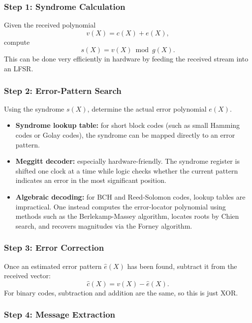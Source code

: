 \documentclass[11pt,oneside]{book}
\providecommand{\tightlist}{\setlength{\itemsep}{0pt}\setlength{\parskip}{0pt}}
\theoremstyle{plain}
\theoremstyle{definition}
\theoremstyle{remark}
\begin{document}
\subsubsection{Step 1: Syndrome
Calculation}\label{step-1-syndrome-calculation}

Given the received polynomial \[v(X)=c(X)+e(X),\] compute
\[s(X)=v(X) \bmod g(X).\] This can be done very efficiently in hardware
by feeding the received stream into an LFSR.

\subsubsection{Step 2: Error-Pattern
Search}\label{step-2-error-pattern-search}

Using the syndrome \(s(X)\), determine the actual error polynomial
\(e(X)\).

\begin{itemize}
\tightlist
\item
  \textbf{Syndrome lookup table:} for short block codes (such as small
  Hamming codes or Golay codes), the syndrome can be mapped directly to
  an error pattern.
\item
  \textbf{Meggitt decoder:} especially hardware-friendly. The syndrome
  register is shifted one clock at a time while logic checks whether the
  current pattern indicates an error in the most significant position.
\item
  \textbf{Algebraic decoding:} for BCH and Reed-Solomon codes, lookup
  tables are impractical. One instead computes the error-locator
  polynomial using methods such as the Berlekamp-Massey algorithm,
  locates roots by Chien search, and recovers magnitudes via the Forney
  algorithm.
\end{itemize}

\subsubsection{Step 3: Error Correction}\label{step-3-error-correction}

Once an estimated error pattern \(\hat{e}(X)\) has been found, subtract
it from the received vector: \[\hat{c}(X)=v(X)-\hat{e}(X).\] For binary
codes, subtraction and addition are the same, so this is just XOR.

\subsubsection{Step 4: Message
Extraction}\label{step-4-message-extraction}
\end{document}

